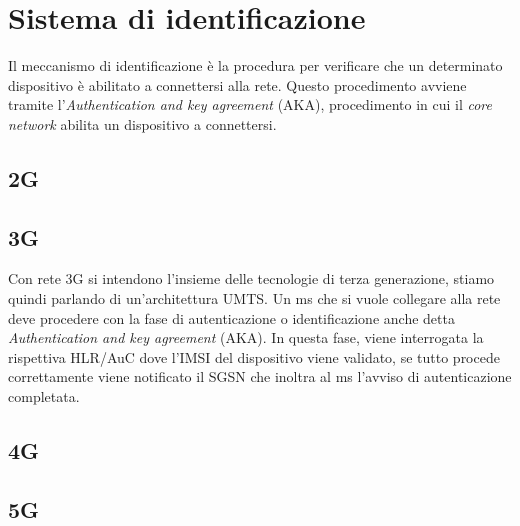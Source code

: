 \section{Sistema di identificazione}
Il meccanismo di identificazione è la procedura per verificare che un determinato dispositivo
è abilitato a connettersi alla rete.
Questo procedimento avviene tramite l'\textit{Authentication and key agreement} (AKA), procedimento in cui
il \textit{core network} abilita un dispositivo a connettersi. 


\subsection{2G}
\subsection{3G}
Con rete 3G si intendono l'insieme delle tecnologie di terza generazione, stiamo quindi parlando di un'architettura UMTS.
Un \acrshort{ms} che si vuole collegare alla rete deve procedere con la fase di autenticazione o identificazione anche detta \textit{Authentication and key agreement}
(AKA). In questa fase, viene interrogata la rispettiva HLR/AuC dove l'IMSI del dispositivo viene validato, se tutto procede correttamente
viene notificato il SGSN che inoltra al \acrshort{ms} l'avviso di autenticazione completata.

\subsection{4G}

\subsection{5G}